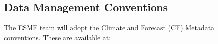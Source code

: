 
\subsection{Data Management Conventions}

The ESMF team will adopt the Climate and Forecast (CF) Metadata 
conventions.  These are available at:\newline
{}






